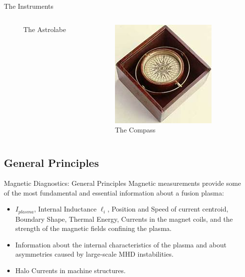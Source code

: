 \documentclass{beamer}
\begin{document}
\begin{frame}{The Instruments}
\begin{columns}
\begin{figure}[ht]
\begin{center}
	\caption{\tiny The Astrolabe}
	\end{center}
	\end{figure}
   {
 	\begin{figure}[ht]
	\begin{center}
	\includegraphics[width=0.9 \columnwidth]{Compass.jpg}
	\caption{\tiny The Compass}
	\end{center}
	\end{figure}
}
\end{columns}
\end{frame}

\subsection{General Principles}

\begin{frame}{ Magnetic Diagnostics: General Principles}%
    Magnetic measurements provide some of the most   \alert{fundamental} and %
\alert{essential} information about a fusion plasma:

  \begin{itemize}
  \item<2->
    $I_{plasma}$, Internal Inductance $\ell_i$,   Position and Speed of current centroid,
	Boundary Shape, Thermal Energy, Currents in the magnet coils,
	and the strength of the magnetic fields confining the plasma.
%
  \item<3->
    Information about the internal characteristics of the plasma and
	about asymmetries caused by large-scale MHD instabilities.
  \item<4-> Halo Currents in machine structures.
  \end{itemize}
\end{frame}
\end{document}

